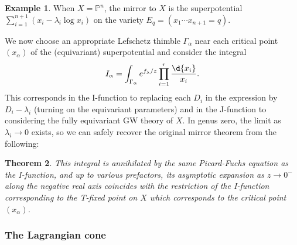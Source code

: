 \documentclass{amsart}
\newtheorem{thm}{Theorem}[section]
\theoremstyle{definition}
\newtheorem{exm}[thm]{Example}
\theoremstyle{remark}
\theoremstyle{plain}
\theoremstyle{definition}
\theoremstyle{remark}
\renewcommand{\P}{\mathbb{P}}
\newcommand{\1}{\mathbf{1}}
\newcommand{\2}{\mathbf{2}}
\newcommand{\3}{\mathbf{3}}
\begin{document}
\begin{exm}
    When \(X = \P^n\), the mirror to \(X\) is the superpotential \(\sum_{i=1}^{n+1} (x_i - \lambda_i \log x_i)\) on the variety \(E_q = (x_1 \cdots x_{n+1} = q)\).   
\end{exm}

We now choose an appropriate Lefschetz thimble \(\Gamma_{\alpha}\) near each critical point \((x_{\alpha})\) of the (equivariant) superpotential and consider the integral
\[ I_{\alpha} = \int_{\Gamma_{\alpha}} e^{f_{\lambda}/z} \prod_{i=1}^r \frac{\d{x_i}}{x_i}. \]
This corresponds in the I-function to replacing each \(D_i\) in the expression by \(D_i - \lambda_i\) (turning on the equivariant parameters) and in the J-function to considering the fully equivariant GW theory of \(X\). In genus zero, the limit as \(\lambda_i \to 0\) exists, so we can safely recover the original mirror theorem from the following:

\begin{thm}
    This integral is annihilated by the same Picard-Fuchs equation as the I-function, and up to various prefactors, its asymptotic expansion as \(z \to 0^-\) along the negative real axis coincides with the restriction of the I-function corresponding to the T-fixed point on \(X\) which corresponds to the critical point \(( x_{\alpha} )\). 
\end{thm}


\subsubsection{The Lagrangian cone}%
\label{ssub:The Lagrangian cone}
\end{document}
